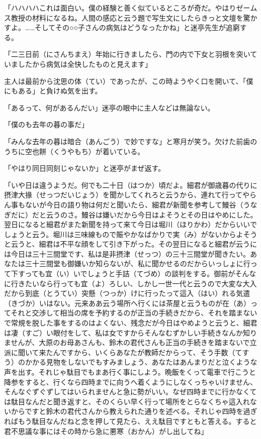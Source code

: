 \documentclass{book}
\begin{document}
「ハハハハこれは面白い。僕の経験と善く似ているところが奇だ。やはりゼームス教授の材料になるね。人間の感応と云う題で写生文にしたらきっと文壇を驚かすよ。\ldots{}\ldots{}そしてその○○子さんの病気はどうなったかね」と迷亭先生が追窮する。

「二三日前（にさんちまえ）年始に行きましたら、門の内で下女と羽根を突いていましたから病気は全快したものと見えます」

主人は最前から沈思の体（てい）であったが、この時ようやく口を開いて、「僕にもある」と負けぬ気を出す。

「あるって、何があるんだい」迷亭の眼中に主人などは無論ない。

「僕のも去年の暮の事だ」

「みんな去年の暮は暗合（あんごう）で妙ですな」と寒月が笑う。欠けた前歯のうちに空也餅（くうやもち）が着いている。

「やはり同日同刻じゃないか」と迷亭がまぜ返す。

「いや日は違うようだ。何でも二十日（はつか）頃だよ。細君が御歳暮の代りに摂津大掾（せっつだいじょう）を聞かしてくれろと云うから、連れて行ってやらん事もないが今日の語り物は何だと聞いたら、細君が新聞を参考して鰻谷（うなぎだに）だと云うのさ。鰻谷は嫌いだから今日はよそうとその日はやめにした。翌日になると細君がまた新聞を持って来て今日は堀川（ほりかわ）だからいいでしょうと云う。堀川は三味線もので賑やかなばかりで実（み）がないからよそうと云うと、細君は不平な顔をして引き下がった。その翌日になると細君が云うには今日は三十三間堂です、私は是非摂津（せっつ）の三十三間堂が聞きたい。あなたは三十三間堂も御嫌いか知らないが、私に聞かせるのだからいっしょに行って下すっても宜（い）いでしょうと手詰（てづめ）の談判をする。御前がそんなに行きたいなら行っても宜（よ）ろしい、しかし一世一代と云うので大変な大入だから到底（とうてい）突懸（つっか）けに行ったって這入（はい）れる気遣（きづか）いはない。元来ああ云う場所へ行くには茶屋と云うものが在（あ）ってそれと交渉して相当の席を予約するのが正当の手続きだから、それを踏まないで常規を脱した事をするのはよくない、残念だが今日はやめようと云うと、細君は凄（すご）い眼付をして、私は女ですからそんなむずかしい手続きなんか知りませんが、大原のお母あさんも、鈴木の君代さんも正当の手続きを踏まないで立派に聞いて来たんですから、いくらあなたが教師だからって、そう手数（てすう）のかかる見物をしないでもすみましょう、あなたはあんまりだと泣くような声を出す。それじゃ駄目でもまあ行く事にしよう。晩飯をくって電車で行こうと降参をすると、行くなら四時までに向うへ着くようにしなくっちゃいけません、そんなぐずぐずしてはいられませんと急に勢がいい。なぜ四時までに行かなくては駄目なんだと聞き返すと、そのくらい早く行って場所をとらなくちゃ這入れないからですと鈴木の君代さんから教えられた通りを述べる。それじゃ四時を過ぎればもう駄目なんだねと念を押して見たら、ええ駄目ですともと答える。すると君不思議な事にはその時から急に悪寒（おかん）がし出してね」
\end{document}
